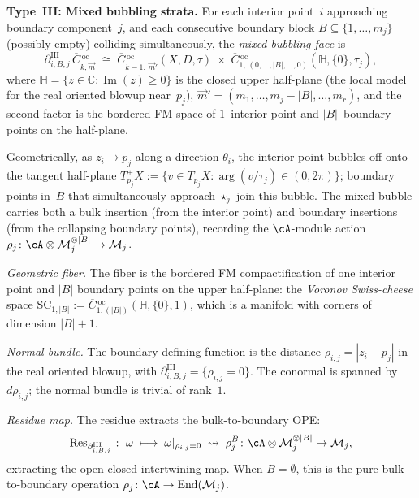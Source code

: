 \begin{proposition}
\medskip
\noindent\textbf{Type~III: Mixed bubbling strata.}
For each interior point~$i$ approaching boundary component~$j$,
and each consecutive boundary block $B \subseteq
\{1, \ldots, m_j\}$ (possibly empty) colliding simultaneously,
the \emph{mixed bubbling face} is
\begin{equation}\label{eq:typeIII-stratum}
\partial_{i,B,j}^{\mathrm{III}}\,
\overline{C}{}^{\,\mathrm{oc}}_{k,\vec{m}}
\;\cong\;
\overline{C}{}^{\,\mathrm{oc}}_{k-1,\, \vec{m}'}(X, D, \tau)
\;\times\;
\overline{C}{}^{\,\mathrm{oc}}_{1,\,
  (0,\ldots,|B|,\ldots,0)}
(\mathbb{H}, \{0\}, \tau_j),
\end{equation}
where $\mathbb{H} = \{z \in \mathbb{C} : \operatorname{Im}(z) \geq 0\}$
is the closed upper half-plane (the local model for the real
oriented blowup near~$p_j$),
$\vec{m}' = (m_1, \ldots, m_j - |B|, \ldots, m_r)$,
and the second factor is the bordered FM space of $1$~interior
point and $|B|$~boundary points on the half-plane.

Geometrically, as $z_i \to p_j$ along a direction $\theta_i$,
the interior point bubbles off onto the tangent half-plane
$T_{p_j}^+ X := \{v \in T_{p_j} X :
\operatorname{arg}(v/\tau_j) \in (0, 2\pi)\}$; boundary points
in~$B$ that simultaneously approach $\star_j$ join this bubble.
The mixed bubble carries both a bulk insertion (from the
interior point) and boundary insertions (from the collapsing
boundary points), recording the $\cA$-module action
$\rho_j \colon \cA \otimes \mathcal{M}_j^{\otimes |B|} \to
\mathcal{M}_j$.

\emph{Geometric fiber.}
The fiber is the bordered FM compactification of one interior
point and $|B|$ boundary points on the upper half-plane: the
\emph{Voronov Swiss-cheese} space
$\mathrm{SC}_{1, |B|} :=
\overline{C}{}^{\,\mathrm{oc}}_{1, (|B|)}(\mathbb{H}, \{0\}, 1)$,
which is a manifold with corners of dimension $|B| + 1$.

\emph{Normal bundle.}
The boundary-defining function is the distance
$\rho_{i,j} = |z_i - p_j|$ in the real oriented blowup, with
$\partial_{i,B,j}^{\mathrm{III}} = \{\rho_{i,j} = 0\}$.  The
conormal is spanned by $d\rho_{i,j}$; the normal bundle is
trivial of rank~$1$.

\emph{Residue map.}
The residue extracts the bulk-to-boundary OPE:
\begin{equation}\label{eq:typeIII-residue}
\operatorname{Res}_{\partial_{i,B,j}^{\mathrm{III}}}
\;\colon\;
\omega \;\longmapsto\;
\omega|_{\rho_{i,j} = 0}
\;\leadsto\;
\rho_j^B
\colon \cA \otimes \mathcal{M}_j^{\otimes |B|} \to
\mathcal{M}_j,
\end{equation}
extracting the open-closed intertwining map.  When $B =
\emptyset$, this is the pure bulk-to-boundary operation
$\rho_j \colon \cA \to \operatorname{End}(\mathcal{M}_j)$.


\end{proposition}
